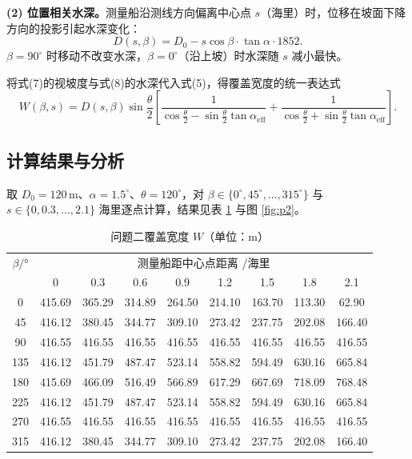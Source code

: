 \documentclass[12pt]{ctexart}
\begin{document}
\textbf{(2) 位置相关水深。}测量船沿测线方向偏离中心点 $s$（海里）时，位移在坡面下降方向的投影引起水深变化：
\begin{equation}
D(s,\beta)=D_0-s\cos\beta\cdot\tan\alpha\cdot1852.
\end{equation}
$\beta=90^\circ$ 时移动不改变水深，$\beta=0^\circ$（沿上坡）时水深随 $s$ 减小最快。

将式(7)的视坡度与式(8)的水深代入式(5)，得覆盖宽度的统一表达式
\begin{equation}
W(\beta,s)=D(s,\beta)\sin\frac{\theta}{2}\left[\frac{1}{\cos\frac{\theta}{2}-\sin\frac{\theta}{2}\tan\alpha_{\mathrm{eff}}}
+\frac{1}{\cos\frac{\theta}{2}+\sin\frac{\theta}{2}\tan\alpha_{\mathrm{eff}}}\right].
\end{equation}

\subsection{计算结果与分析}

取 $D_0=120\,\mathrm{m}$、$\alpha=1.5^\circ$、$\theta=120^\circ$，对 $\beta\in\{0^\circ,45^\circ,\dots,315^\circ\}$ 与 $s\in\{0,0.3,\dots,2.1\}$ 海里逐点计算，结果见表 \ref{tab:p2} 与图 \ref{fig:p2}。

\begin{table}[H]\centering
\caption{问题二覆盖宽度 $W$（单位：m）}
\label{tab:p2}
\small
\begin{tabular}{ccccccccc}
\toprule
$\beta/$° & \multicolumn{8}{c}{测量船距中心点距离 /海里} \\
 & 0 & 0.3 & 0.6 & 0.9 & 1.2 & 1.5 & 1.8 & 2.1 \\
\midrule
0 & 415.69 & 365.29 & 314.89 & 264.50 & 214.10 & 163.70 & 113.30 & 62.90 \\
45 & 416.12 & 380.45 & 344.77 & 309.10 & 273.42 & 237.75 & 202.08 & 166.40 \\
90 & 416.55 & 416.55 & 416.55 & 416.55 & 416.55 & 416.55 & 416.55 & 416.55 \\
135 & 416.12 & 451.79 & 487.47 & 523.14 & 558.82 & 594.49 & 630.16 & 665.84 \\
180 & 415.69 & 466.09 & 516.49 & 566.89 & 617.29 & 667.69 & 718.09 & 768.48 \\
225 & 416.12 & 451.79 & 487.47 & 523.14 & 558.82 & 594.49 & 630.16 & 665.84 \\
270 & 416.55 & 416.55 & 416.55 & 416.55 & 416.55 & 416.55 & 416.55 & 416.55 \\
315 & 416.12 & 380.45 & 344.77 & 309.10 & 273.42 & 237.75 & 202.08 & 166.40 \\
\bottomrule
\end{tabular}
\end{table}
\end{document}
